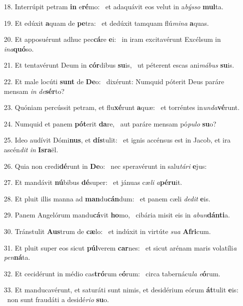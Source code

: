 18. Interrúpit petram \textbf{in} e\textbf{ré}mo: \ast\  et adaquávit eos velut in a\textit{býs}\textit{so} \textbf{mul}ta.\

19. Et edúxit \textbf{a}quam de \textbf{pe}tra: \ast\  et dedúxit tamquam flú\textit{mi}\textit{na} \textbf{a}quas.\

20. Et apposuérunt adhuc pec\textbf{cá}re \textbf{e}i: \ast\  in iram excitavérunt Excélsum in \textit{in}\textit{a}\textbf{quó}so.\

21. Et tentavérunt Deum in \textbf{cór}dibus \textbf{su}is, \ast\  ut péterent escas ani\textit{má}\textit{bus} \textbf{su}is.\

22. Et male locúti \textbf{sunt} de \textbf{De}o: \ast\  dixérunt: Numquid póterit Deus paráre mensam \textit{in} \textit{de}\textbf{sér}to?\

23. Quóniam percússit petram, et flu\textbf{xé}runt \textbf{a}quæ: \ast\  et torréntes in\textit{un}\textit{da}\textbf{vé}runt.\

24. Numquid et panem \textbf{pót}erit \textbf{da}re, \ast\  aut paráre mensam pó\textit{pu}\textit{lo} \textbf{su}o?\

25. Ideo audívit Dómi\textbf{nus}, et \textbf{dís}tulit: \ast\  et ignis accénsus est in Jacob, et ira ascén\textit{dit} \textit{in} \textbf{Is}\textbf{ra}ël.\

26. Quia non credi\textbf{dé}runt in \textbf{De}o: \ast\  nec speravérunt in salu\textit{tá}\textit{ri} \textbf{e}jus:\

27. Et mandávit \textbf{nú}bibus \textbf{dé}super: \ast\  et jánuas cæ\textit{li} \textit{a}\textbf{pé}\textbf{ru}it.\

28. Et pluit illis manna ad \textbf{man}du\textbf{cán}dum: \ast\  et panem cæli \textit{de}\textit{dit} \textbf{e}is.\

29. Panem Angelórum mandu\textbf{cá}vit \textbf{ho}mo, \ast\  cibária misit eis in \textit{ab}\textit{un}\textbf{dán}\textbf{ti}a.\

30. Tránstulit \textbf{Aus}trum de \textbf{cæ}lo: \ast\  et indúxit in virtúte \textit{su}\textit{a} \textbf{A}\textbf{fri}cum.\

31. Et pluit super eos sicut \textbf{púl}verem \textbf{car}nes: \ast\  et sicut arénam maris volatíli\textit{a} \textit{pen}\textbf{ná}ta.\

32. Et cecidérunt in médio cas\textbf{tró}rum e\textbf{ó}rum: \ast\  circa tabernácu\textit{la} \textit{e}\textbf{ó}rum.\

33. Et manducavérunt, et saturáti sunt nimis, et desidérium eórum \textbf{át}tulit \textbf{e}is: \ast\  non sunt fraudáti a desidé\textit{ri}\textit{o} \textbf{su}o.\

